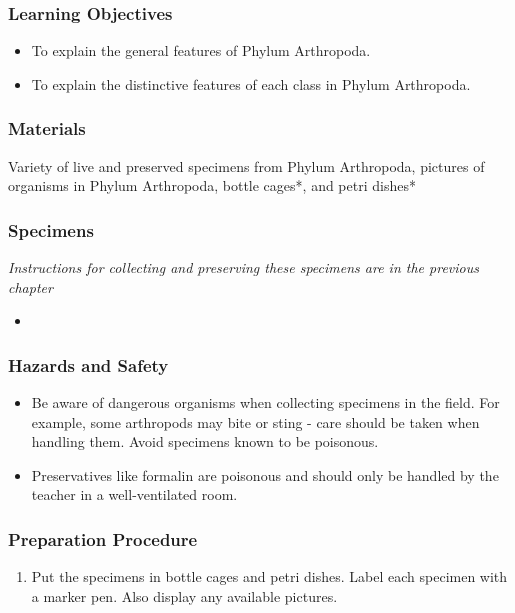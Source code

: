 \subsubsection*{Learning Objectives}
\begin{itemize}
\item{To explain the general features of Phylum Arthropoda.}
\item{To explain the distinctive features of each class in Phylum Arthropoda.}
\end{itemize}

\subsubsection*{Materials}
Variety of live and preserved specimens from Phylum Arthropoda, pictures of organisms in Phylum Arthropoda, bottle cages*, and petri dishes*

\subsubsection*{Specimens}
\textit{Instructions for collecting and preserving these specimens are in the previous chapter}
\begin{itemize}
\item{}
\end{itemize}

\subsubsection*{Hazards and Safety}
\begin{itemize}
\item{Be aware of dangerous organisms when collecting specimens in the field. For example, some arthropods may bite or sting - care should be taken when handling them. Avoid specimens known to be poisonous.}
\item{Preservatives like formalin are poisonous and should only be handled by the teacher in a well-ventilated room.}
\end{itemize}

\subsubsection*{Preparation Procedure}
\begin{enumerate}
\item{Put the specimens in bottle cages and petri dishes. Label each specimen with a marker pen. Also display any available pictures.}
\end{enumerate}

